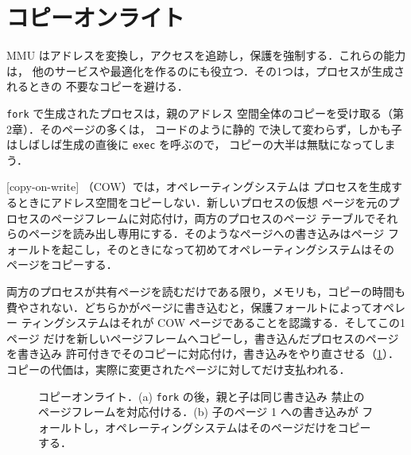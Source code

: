 \documentclass[../main.tex]{subfiles}
\begin{document}
\section{コピーオンライト}
\label{sec:l08-cow}

MMU はアドレスを変換し，アクセスを追跡し，保護を強制する．これらの能力は，
他のサービスや最適化を作るのにも役立つ．その1つは，プロセスが生成されるときの
不要なコピーを避ける．

\texttt{fork} で生成されたプロセスは，親のアドレス
空間全体のコピーを受け取る（第2章）．そのページの多くは，
コードのように静的
で決して変わらず，しかも子はしばしば生成の直後に \texttt{exec} を呼ぶので，
コピーの大半は無駄になってしまう．

\begin{definition}[コピーオンライト]
  [copy-on-write]%
  （COW）では，オペレーティングシステムは
  プロセスを生成するときにアドレス空間をコピーしない．新しいプロセスの仮想
  ページを元のプロセスのページフレームに対応付け，両方のプロセスのページ
  テーブルでそれらのページを読み出し専用にする．そのようなページへの書き込みはページ
  フォールトを起こし，そのときになって初めてオペレーティングシステムはその
  ページをコピーする．
\end{definition}

両方のプロセスが共有ページを読むだけである限り，メモリも，コピーの時間も
費やされない．どちらかがページに書き込むと，保護フォールトによってオペレー
ティングシステムはそれが COW ページであることを認識する．そしてこの1ページ
だけを新しいページフレームへコピーし，書き込んだプロセスのページを書き込み
許可付きでそのコピーに対応付け，書き込みをやり直させる（\cref{fig:l08-cow}）．
コピーの代価は，実際に変更されたページに対してだけ支払われる．

\begin{figure}[htbp]
  \centering
  
  \caption{コピーオンライト．(a) \texttt{fork} の後，親と子は同じ書き込み
    禁止のページフレームを対応付ける．(b) 子のページ 1 への書き込みが
    フォールトし，オペレーティングシステムはそのページだけをコピーする．}
  \label{fig:l08-cow}
\end{figure}
\end{document}
